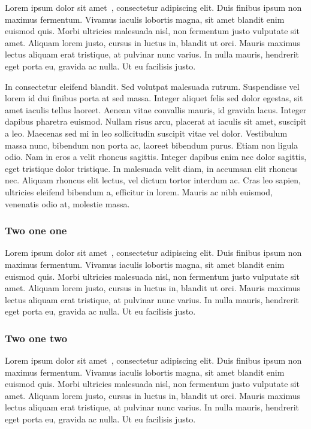 Lorem ipsum dolor sit amet~\cite{Comer2005aa}, consectetur adipiscing elit. Duis finibus ipsum non maximus fermentum. Vivamus iaculis lobortis magna, sit amet blandit enim euismod quis. Morbi ultricies malesuada nisl, non fermentum justo vulputate sit amet. Aliquam lorem justo, cursus in luctus in, blandit ut orci. Mauris maximus lectus aliquam erat tristique, at pulvinar nunc varius. In nulla mauris, hendrerit eget porta eu, gravida ac nulla. Ut eu facilisis justo. \newline

In consectetur eleifend blandit. Sed volutpat malesuada rutrum. Suspendisse vel lorem id dui finibus porta at sed massa. Integer aliquet felis sed dolor egestas, sit amet iaculis tellus laoreet. Aenean vitae convallis mauris, id gravida lacus. Integer dapibus pharetra euismod. Nullam risus arcu, placerat at iaculis sit amet, suscipit a leo. Maecenas sed mi in leo sollicitudin suscipit vitae vel dolor. Vestibulum massa nunc, bibendum non porta ac, laoreet bibendum purus. Etiam non ligula odio. Nam in eros a velit rhoncus sagittis. Integer dapibus enim nec dolor sagittis, eget tristique dolor tristique. In malesuada velit diam, in accumsan elit rhoncus nec. Aliquam rhoncus elit lectus, vel dictum tortor interdum ac. Cras leo sapien, ultricies eleifend bibendum a, efficitur in lorem. Mauris ac nibh euismod, venenatis odio at, molestie massa.

\subsubsection{Two one one}
\label{ssub:two_one_one}

Lorem ipsum dolor sit amet~\cite{Smeets2006aa}, consectetur adipiscing elit. Duis finibus ipsum non maximus fermentum. Vivamus iaculis lobortis magna, sit amet blandit enim euismod quis. Morbi ultricies malesuada nisl, non fermentum justo vulputate sit amet. Aliquam lorem justo, cursus in luctus in, blandit ut orci. Mauris maximus lectus aliquam erat tristique, at pulvinar nunc varius. In nulla mauris, hendrerit eget porta eu, gravida ac nulla. Ut eu facilisis justo. 


\subsubsection{Two one two}
\label{ssub:two_one_two}

Lorem ipsum dolor sit amet~\cite{Smeets2006aa}, consectetur adipiscing elit. Duis finibus ipsum non maximus fermentum. Vivamus iaculis lobortis magna, sit amet blandit enim euismod quis. Morbi ultricies malesuada nisl, non fermentum justo vulputate sit amet. Aliquam lorem justo, cursus in luctus in, blandit ut orci. Mauris maximus lectus aliquam erat tristique, at pulvinar nunc varius. In nulla mauris, hendrerit eget porta eu, gravida ac nulla. Ut eu facilisis justo. 

